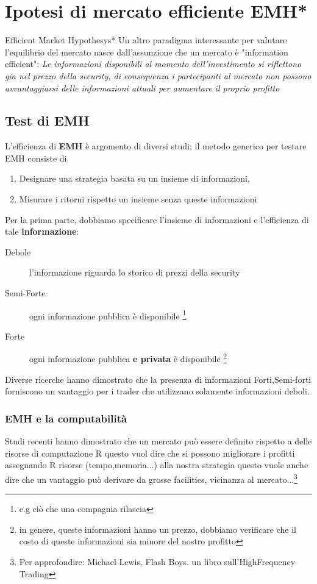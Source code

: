 \documentclass[a4paper,11pt]{report}
\begin{document}
{\section{Ipotesi di mercato efficiente EMH*}
	{\tiny{Efficient Market Hypothesys*}} \newline
	Un altro paradigma interessante per valutare l'equilibrio del mercato nasce dall'assunzione che un mercato è "information efficient": \newline
	\emph{ Le informazioni disponibili al momento dell'investimento si riflettono gia nel prezzo della security, di consequenza i partecipanti al mercato non possono avvantaggiarsi delle informazioni attuali per aumentare il proprio profitto}

\subsection{Test di EMH}
	L'efficienza di \textbf{EMH} è argomento di diversi studi; \newline
	il metodo generico per testare EMH consiste di
\begin{enumerate}
	\item Designare una strategia basata su un insieme di informazioni,
	\item Misurare i ritorni rispetto un insieme senza queste informazioni
\end{enumerate}
	Per la prima parte, dobbiamo specificare l'insieme di informazioni e l'efficienza di tale \textbf{informazione}:
\begin{description}
	\item[Debole] l'informazione riguarda lo storico di prezzi della security
	\item[Semi-Forte] ogni informazione pubblica è disponibile \footnote{e.g ciò che una compagnia rilascia}
	\item[Forte] ogni informazione pubblica \textbf{e privata} è disponibile \footnote{in genere, queste informazioni hanno un prezzo, dobbiamo verificare che il costo di queste informazioni sia minore del nostro profitto}
\end{description}
	Diverse ricerche hanno dimostrato che la presenza di informazioni Forti,Semi-forti forniscono un vantaggio per i trader che 		utilizzano solamente informazioni deboli. \newline
\subsubsection{EMH e la computabilità}
	Studi recenti hanno dimostrato che un mercato può essere definito rispetto	 a delle risorse di computazione R
	questo vuol dire che si possono migliorare i profitti assegnando R risorse (tempo,memoria...) alla nostra strategia
	questo vuole anche dire che un vantaggio può derivare da grosse facilities, vicinanza al mercato...\footnote{Per approfondire: Michael Lewis, Flash Boys. un libro sull'HighFrequency Trading} %
\newpage

}
\end{document}
